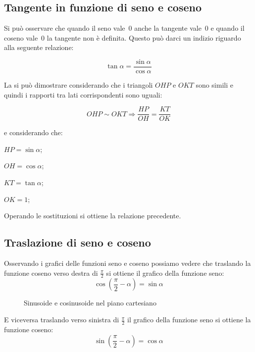 \subsection{Tangente in funzione di seno e coseno}

Si può osservare che quando il seno vale~0 anche la tangente vale~0 e quando 
il coseno vale~0 la tangente non è definita. Questo può darci un indizio 
riguardo alla seguente relazione:

\[\tan \alpha = \frac{\sin \alpha}{\cos \alpha}\]

La si può dimostrare considerando che i triangoli $OHP$ e $OKT$ sono simili
e quindi i rapporti tra lati corrispondenti sono uguali:

\[OHP \sim OKT \Rightarrow \frac{HP}{OH} = \frac{KT}{OK}\]

\begin{minipage}{.3\textwidth}
e considerando che:
\begin{itemize*}
 \item $HP = \sin \alpha$;
 \item $OH = \cos \alpha$;
 \item $KT = \tan \alpha$;
 \item $OK = 1$;
\end{itemize*}
Operando le sostituzioni si ottiene la relazione precedente.
\end{minipage}
\begin{minipage}{.6\textwidth}
\begin{center}
 
\end{center}
\end{minipage}

\subsection{Traslazione di seno e coseno}

Osservando i grafici delle funzioni seno e coseno possiamo vedere che traslando
la funzione coseno verso destra di $\frac{\pi}{2}$ si ottiene il grafico della 
funzione seno:
\[\cos\left(\frac{\pi}{2}-\alpha\right)=\sin\alpha\]
\vspace{-6pt}
\begin{figure}[!h] 
  \begin{center}
\begin{inaccessibleblock}
    
    \caption{Sinusoide e cosinusoide nel piano cartesiano}
    \label{fig:trigo_sin_cos}
\end{inaccessibleblock}
  \end{center}
\vspace{-12pt}
\end{figure} 
\vspace{-6pt}
E viceversa traslando verso sinistra di $\frac{\pi}{2}$ il grafico della 
funzione seno si ottiene la funzione coseno:
\[\sin\left(\frac{\pi}{2}-\alpha\right)=\cos\alpha\]


